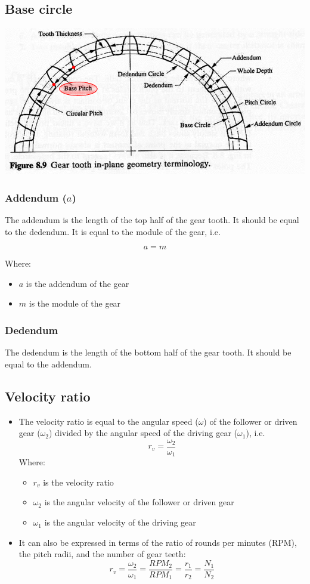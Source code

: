 \documentclass[11pt]{article}
\begin{document}
 \newpage
\subsection{Base circle}
\label{sec:orged6ddc3}
\begin{center}
\includegraphics[width=.9\linewidth]{./images/base-circle-diagram.png}
\end{center}
\subsubsection{Addendum (\(a\))}
\label{sec:orgd6ab950}
The addendum is the length of the top half of the gear tooth. It should be equal to the dedendum. It is equal to the module of the gear, i.e.

\[a = m\]

Where:
\begin{itemize}
\item \(a\) is the addendum of the gear
\item \(m\) is the module of the gear
\end{itemize}
\subsubsection{Dedendum}
\label{sec:org4f0ae17}
The dedendum is the length of the bottom half of the gear tooth. It should be equal to the addendum.

 \newpage
\subsection{Velocity ratio}
\label{sec:org55e5179}
\begin{itemize}
\item The velocity ratio is equal to the angular speed (\(\omega\)) of the follower or driven gear (\(\omega_2\)) divided by the angular speed of the driving gear (\(\omega_1\)), i.e.
\[r_v = \frac{\omega_2}{\omega_1}\]
Where:
\begin{itemize}
\item \(r_v\) is the velocity ratio
\item \(\omega_2\) is the angular velocity of the follower or driven gear
\item \(\omega_1\) is the angular velocity of the driving gear
\end{itemize}

\item It can also be expressed in terms of the ratio of rounds per minutes (RPM), the pitch radii, and the number of gear teeth:
\[r_v = \frac{\omega_2}{\omega_1} = \frac{RPM_2}{RPM_1} = \frac{r_1}{r_2} = \frac{N_1}{N_2}\]
\end{itemize}
\end{document}
